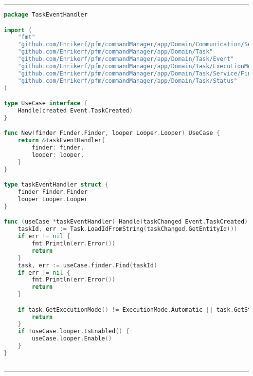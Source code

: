 
\phantom{blank}
\vspace{5mm}
\hrule
\begin{lstlisting}[language=Go,caption={TaskEventHandler.go},breaklines=true,label={lst:TaskEventHandlerUseCase}]
package TaskEventHandler

import (
	"fmt"
	"github.com/Enrikerf/pfm/commandManager/app/Domain/Communication/Service/Looper"
	"github.com/Enrikerf/pfm/commandManager/app/Domain/Task"
	"github.com/Enrikerf/pfm/commandManager/app/Domain/Task/Event"
	"github.com/Enrikerf/pfm/commandManager/app/Domain/Task/ExecutionMode"
	"github.com/Enrikerf/pfm/commandManager/app/Domain/Task/Service/Finder"
	"github.com/Enrikerf/pfm/commandManager/app/Domain/Task/Status"
)

type UseCase interface {
	Handle(created Event.TaskCreated)
}

func New(finder Finder.Finder, looper Looper.Looper) UseCase {
	return &taskEventHandler{
		finder: finder,
		looper: looper,
	}
}

type taskEventHandler struct {
	finder Finder.Finder
	looper Looper.Looper
}

func (useCase *taskEventHandler) Handle(taskChanged Event.TaskCreated) {
	taskId, err := Task.LoadIdFromString(taskChanged.GetEntityId())
	if err != nil {
		fmt.Println(err.Error())
		return
	}
	task, err := useCase.finder.Find(taskId)
	if err != nil {
		fmt.Println(err.Error())
		return
	}

	if task.GetExecutionMode() != ExecutionMode.Automatic || task.GetStatus().Value() != Status.Pending {
		return
	}
	if !useCase.looper.IsEnabled() {
		useCase.looper.Enable()
	}
}



\end{lstlisting}
\hrule